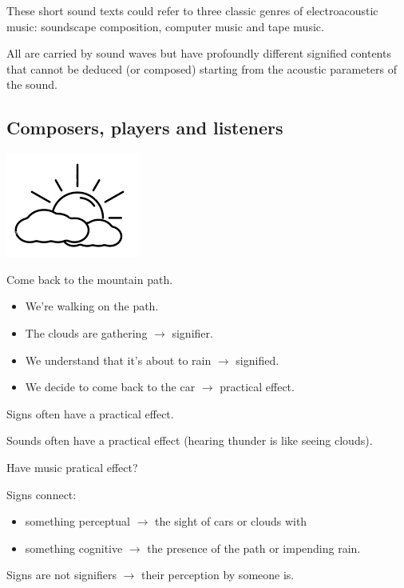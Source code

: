 These short sound texts could refer to three classic genres of electroacoustic music: soundscape composition, computer music and tape music.

All are carried by sound waves but have profoundly different signified contents that cannot be deduced (or composed) starting from the acoustic parameters of the sound.

\subsection{Composers, players and listeners }\label{composers-players-and-listeners}

\begin{center}
\includegraphics[scale=0.6]{../img/nuvole.png}
\end{center}

Come back to the mountain path.

\begin{itemize}
\tightlist
\item We're walking on the path.
\item The clouds are gathering \(\rightarrow\) signifier.
\item We understand that it's about to rain \(\rightarrow\) signified.
\item We decide to come back to the car \(\rightarrow\) practical effect.
\end{itemize}

Signs often have a practical effect.

Sounds often have a practical effect (hearing thunder is like seeing clouds).

Have music pratical effect?

Signs connect: 
\begin{itemize}
\item something perceptual \(\rightarrow\) the sight of cars or clouds with 
\item something cognitive \(\rightarrow\) the presence of the path or impending rain.
\end{itemize}

Signs are not signifiers \(\rightarrow\) their perception by someone is.

